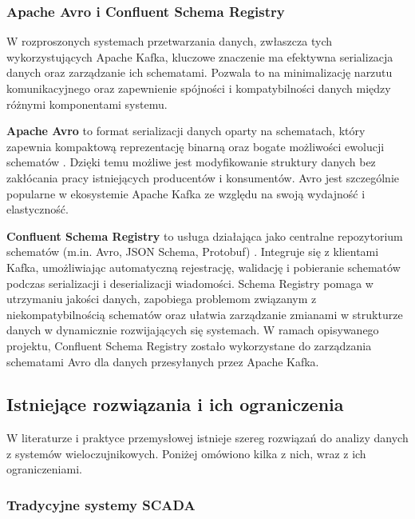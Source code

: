 \subsubsection{Apache Avro i Confluent Schema Registry}
\label{subsubsec:avro_schema_registry}

W rozproszonych systemach przetwarzania danych, zwłaszcza tych wykorzystujących Apache Kafka, kluczowe znaczenie ma efektywna serializacja danych oraz zarządzanie ich schematami. Pozwala to na minimalizację narzutu komunikacyjnego oraz zapewnienie spójności i kompatybilności danych między różnymi komponentami systemu.

\textbf{Apache Avro} to format serializacji danych oparty na schematach, który zapewnia kompaktową reprezentację binarną oraz bogate możliwości ewolucji schematów \cite{avro_documentation}. Dzięki temu możliwe jest modyfikowanie struktury danych bez zakłócania pracy istniejących producentów i konsumentów. Avro jest szczególnie popularne w ekosystemie Apache Kafka ze względu na swoją wydajność i elastyczność.

\textbf{Confluent Schema Registry} to usługa działająca jako centralne repozytorium schematów (m.in. Avro, JSON Schema, Protobuf) \cite{confluent_schema_registry}. Integruje się z klientami Kafka, umożliwiając automatyczną rejestrację, walidację i pobieranie schematów podczas serializacji i deserializacji wiadomości. Schema Registry pomaga w utrzymaniu jakości danych, zapobiega problemom związanym z niekompatybilnością schematów oraz ułatwia zarządzanie zmianami w strukturze danych w dynamicznie rozwijających się systemach. W ramach opisywanego projektu, Confluent Schema Registry zostało wykorzystane do zarządzania schematami Avro dla danych przesyłanych przez Apache Kafka.

\subsection{Istniejące rozwiązania i ich ograniczenia}
\label{subsec:istniejace_rozwiazania}

W literaturze i praktyce przemysłowej istnieje szereg rozwiązań do analizy danych z systemów wieloczujnikowych. Poniżej omówiono kilka z nich, wraz z ich ograniczeniami.

\subsubsection{Tradycyjne systemy SCADA}
\label{subsubsec:scada}


